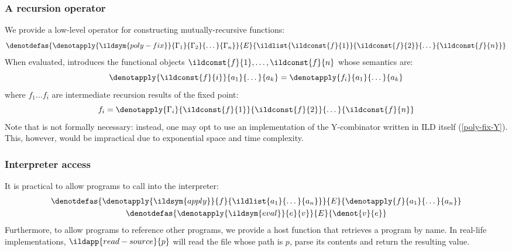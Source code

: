 \subsubsection{A recursion operator}

We provide a low-level operator  for constructing
mutually-recursive functions:
\[ \denotdefas{\denotapply{\ildsym{poly-fix}}{\Gamma_1}{\Gamma_2}{\dots}{\Gamma_n}}{E}{\ildlist{\ildconst{f}{1}}{\ildconst{f}{2}}{\dots}{\ildconst{f}{n}}} \]
When evaluated,  introduces the functional objects \(\ildconst{f}{1}, \dots, \ildconst{f}{n}\) whose semantics are:
\[
  \denotapply{\ildconst{f}{i}}{a_1}{\dots}{a_k}
  = \denotapply{f_i}{a_1}{\dots}{a_k}
\]
where \( f_1 \dots f_i \) are intermediate recursion results of the fixed point:
\[ f_i = \denotapply{\Gamma_i}{\ildconst{f}{1}}{\ildconst{f}{2}}{\dots}{\ildconst{f}{n}} \]
Note that  is not formally necessary: instead, one may
opt to use an implementation of the Y-combinator written in ILD itself
(\cref{poly-fix-Y}). This, however, would be impractical due to exponential
space and time complexity.


\subsubsection{Interpreter access}
It is practical to allow programs to call into the interpreter:
\begin{gather*}
  \denotdefas{\denotapply{\ildsym{apply}}{f}{\ildlist{a_1}{\dots}{a_n}}}{E}{\denotapply{f}{a_1}{\dots}{a_n}}\\
  \denotdefas{\denotapply{\ildsym{eval}}{e}{v}}{E}{\denot{v}{e}}
\end{gather*}
Furthermore, to allow programs to reference other programs, we provide
a host function  that retrieves a program by name.
In real-life implementations, \(\ildapp{read-source}{p}\) will read
the file whose path is \(p\), parse its contents and return the resulting value.
